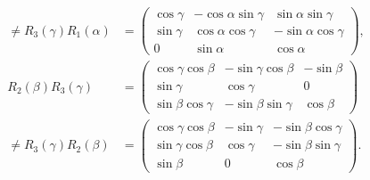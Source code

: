 \documentclass[11pt]{exam}
\begin{document}
\begin{questions}
\begin{solution}
\begin{align*}
		\neq R_3(\gamma)R_1(\alpha)&=\left(\begin{array}{ccc}\cos\gamma&-\cos\alpha\sin\gamma&\sin\alpha\sin\gamma\\\sin\gamma&\cos\alpha\cos\gamma&-\sin\alpha\cos\gamma\\0&\sin\alpha&\cos\alpha\end{array}\right),\\
		R_2(\beta)R_3(\gamma)&=\left(\begin{array}{ccc}\cos\gamma\cos\beta&-\sin\gamma\cos\beta&-\sin\beta\\\sin\gamma&\cos\gamma&0\\\sin\beta\cos\gamma&-\sin\beta\sin\gamma&\cos\beta\end{array}\right)\\
		\neq R_3(\gamma)R_2(\beta)&=\left(\begin{array}{ccc}\cos\gamma\cos\beta&-\sin\gamma&-\sin\beta\cos\gamma\\\sin\gamma\cos\beta&\cos\gamma&-\sin\beta\sin\gamma\\\sin\beta&0&\cos\beta\end{array}\right).
	\end{align*}
\end{solution}





\end{questions}
\end{document}

